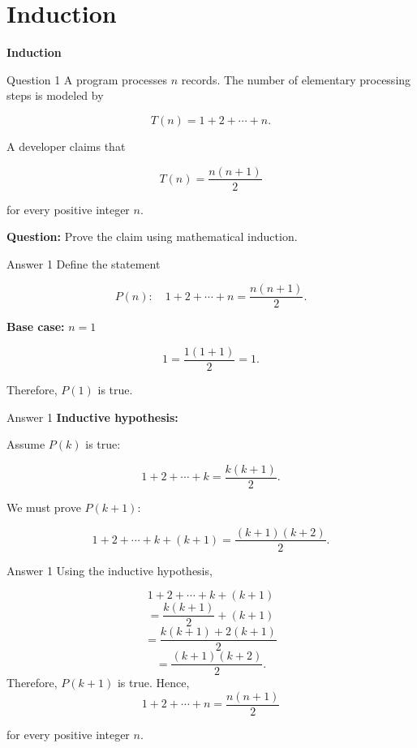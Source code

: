\section{Induction}

\begin{frame}
\centering
\Huge\textbf{Induction}
\end{frame}


\begin{frame}{Question 1}
A program processes $n$ records. The number of elementary processing steps is modeled by

$$
T(n)=1+2+\cdots+n.
$$

A developer claims that

$$
T(n)=\frac{n(n+1)}{2}
$$

for every positive integer $n$.

\textbf{Question:} Prove the claim using mathematical induction.
\end{frame}

\begin{frame}{Answer 1}
Define the statement

$$
P(n):\quad
1+2+\cdots+n=\frac{n(n+1)}{2}.
$$

\textbf{Base case:} $n=1$

$$
1=\frac{1(1+1)}{2}=1.
$$

Therefore, $P(1)$ is true.
\end{frame}

\begin{frame}{Answer 1}
\textbf{Inductive hypothesis:}

Assume $P(k)$ is true:

$$
1+2+\cdots+k
=
\frac{k(k+1)}{2}.
$$

We must prove $P(k+1)$:

$$
1+2+\cdots+k+(k+1)
=
\frac{(k+1)(k+2)}{2}.
$$

\end{frame}

\begin{frame}{Answer 1}
Using the inductive hypothesis,

$$
1+2+\cdots+k+(k+1)
$$
$$
=
\frac{k(k+1)}{2}+(k+1)
$$
$$
=
\frac{k(k+1)+2(k+1)}{2}
$$
$$
=
\frac{(k+1)(k+2)}{2}.
$$
Therefore, $P(k+1)$ is true.
Hence,
$$
\boxed{
1+2+\cdots+n=\frac{n(n+1)}{2}
}
$$

for every positive integer $n$.
\end{frame}

